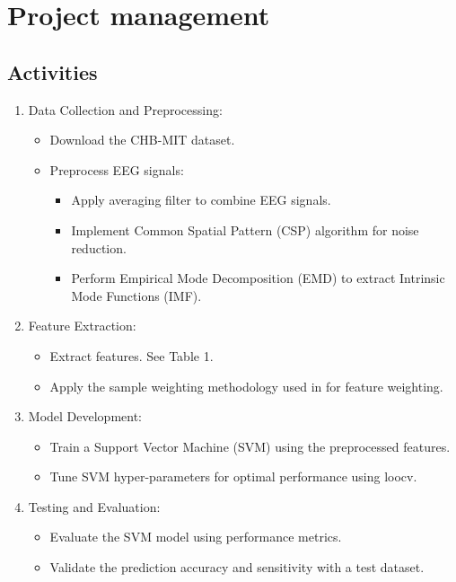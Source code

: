 \documentclass[12pt]{article}
\begin{document}
\section{Project management}
\subsection{Activities}

\begin{enumerate}
    \item Data Collection and Preprocessing:
    \begin{itemize}
        \item Download the CHB-MIT dataset.
        \item Preprocess EEG signals:
        \begin{itemize}
            \item Apply averaging filter to combine EEG signals.
            \item Implement Common Spatial Pattern (CSP) algorithm for noise reduction.
            \item Perform Empirical Mode Decomposition (EMD) to extract Intrinsic Mode Functions (IMF).
        \end{itemize}
    \end{itemize}
    
    \item Feature Extraction:
    \begin{itemize}
        \item Extract features. See Table 1.
        \item Apply the sample weighting methodology used in \cite{gao2022general} for feature weighting.
    \end{itemize}
    
    \item Model Development:
    \begin{itemize}
        \item Train a Support Vector Machine (SVM) using the preprocessed features.
        \item Tune SVM hyper-parameters for optimal performance using \acrshort{loocv}.
    \end{itemize}
    
    \item Testing and Evaluation:
    \begin{itemize}
        \item Evaluate the SVM model using performance metrics.
        \item Validate the prediction accuracy and sensitivity with a test dataset.
    \end{itemize}
    

\end{enumerate}
\end{document}
